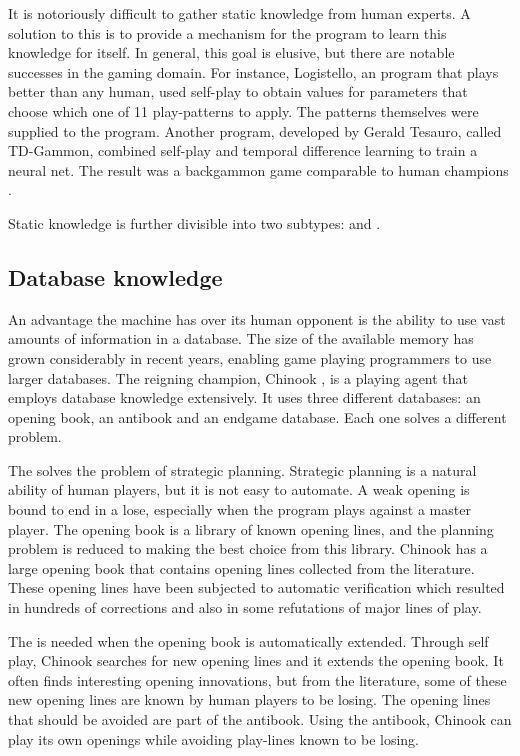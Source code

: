 It is notoriously difficult to gather static knowledge from human experts.  A solution to this  is to provide a mechanism for the program to learn this knowledge for itself.  In general, this goal is elusive, but there are notable successes in the gaming domain. For instance,  Logistello, an  program that plays better than any human, used self-play to obtain values for parameters that choose which one of 11 play-patterns to apply.  The patterns themselves were supplied to the program. Another program, developed by Gerald Tesauro, called TD-Gammon, combined self-play and temporal difference learning to train a neural net.  The result was a backgammon game comparable to human champions \cite{tesauro:learning}.

Static knowledge is further divisible into two subtypes: \newline {} and .  

\subsection{Database knowledge}
An advantage the machine has over its human opponent is the ability to use vast amounts of information in a database.   The size of the available memory has grown considerably in recent years, enabling game playing programmers to use larger databases.   
The reigning  champion, Chinook \cite{schaeffer:solving}, is a playing agent that employs database knowledge extensively.  It uses three different databases: an opening book, an antibook and an endgame database.  Each one solves a different problem.

The  solves the problem of  strategic planning.  Strategic planning is a natural ability of human players, but it is not easy to automate.  A weak opening is bound to end in a lose, especially when the program plays against a master player. The opening book  is a library of known opening lines, and the planning problem is reduced to making the best choice from this library.  Chinook has a large opening book that  contains opening lines collected from the  literature.  These opening lines have been subjected to automatic verification which resulted in hundreds of corrections and also in some refutations of major lines of play.   

The  is needed when the opening book is automatically extended.  Through self play, Chinook searches for new opening lines and it extends the opening book.  It often finds interesting opening innovations, but from the  literature, some of these new opening lines are known by human players to be losing. The opening lines that should be avoided are part of the antibook.   Using the antibook, Chinook can play its own openings while avoiding play-lines known to be losing.

